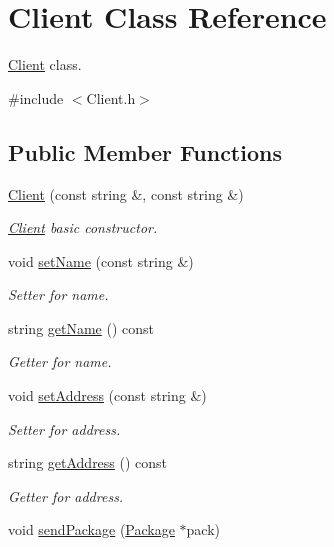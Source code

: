 \hypertarget{classClient}{}\section{Client Class Reference}
\label{classClient}


\hyperlink{classClient}{Client} class.  




{\ttfamily \#include $<$Client.\+h$>$}

\subsection*{Public Member Functions}
\begin{DoxyCompactItemize}
\item 
\hyperlink{classClient_a48f1cf82b72f664d7cc64a4f3022f5eb}{Client} (const string \&, const string \&)
\begin{DoxyCompactList}\small\item\em \hyperlink{classClient}{Client} basic constructor. \end{DoxyCompactList}\item 
void \hyperlink{classClient_ab78b7ecbedb2d6fc0e0df3dfa8c973bc}{set\+Name} (const string \&)
\begin{DoxyCompactList}\small\item\em Setter for name. \end{DoxyCompactList}\item 
string \hyperlink{classClient_a28a677584ad4793b50b31c2e75039e2c}{get\+Name} () const 
\begin{DoxyCompactList}\small\item\em Getter for name. \end{DoxyCompactList}\item 
void \hyperlink{classClient_a8a035b3e170849283f8b130965c5fa75}{set\+Address} (const string \&)
\begin{DoxyCompactList}\small\item\em Setter for address. \end{DoxyCompactList}\item 
string \hyperlink{classClient_a291fb22c4fccb2a6b182c355078553ed}{get\+Address} () const 
\begin{DoxyCompactList}\small\item\em Getter for address. \end{DoxyCompactList}\item 
void \hyperlink{classClient_a2127f6355c6d4fe400f3dd314e1fabc8}{send\+Package} (\hyperlink{classPackage}{Package} $\ast$pack)

\end{DoxyCompactItemize}
